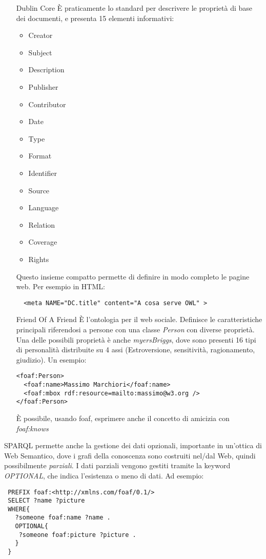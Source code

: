\begin{itemize}
\item[Dublin Core] \`E praticamente lo standard per descrivere le propriet\`a di base dei documenti, e presenta 15 elementi informativi:
  \begin{itemize}
  \item Creator
  \item Subject
  \item Description
  \item Publisher
  \item Contributor
  \item Date
  \item Type
  \item Format
  \item Identifier
  \item Source
  \item Language
  \item Relation
  \item Coverage
  \item Rights
  \end{itemize}
  Questo insieme compatto permette di definire in modo completo le pagine web. Per esempio in HTML:
\begin{verbatim}
  <meta NAME="DC.title" content="A cosa serve OWL" >
\end{verbatim}

\item[Friend Of A Friend]\`E l'ontologia per il web sociale. Definisce le caratteristiche principali riferendosi a persone con una classe \textit{Person} con diverse propriet\`a. Una delle possibili propriet\`a \`e anche \textit{myersBriggs}, dove sono presenti 16 tipi di personalit\`a distribuite su 4 assi (Estroversione, sensitivit\`a, ragionamento, giudizio). Un esempio:
\begin{verbatim}
<foaf:Person>
  <foaf:name>Massimo Marchiori</foaf:name>
  <foaf:mbox rdf:resource=mailto:massimo@w3.org />
</foaf:Person>
\end{verbatim}

\`E possibile, usando foaf, esprimere anche il concetto di amicizia con \textit{foaf:knows}
\end{itemize}


SPARQL permette anche la gestione dei dati opzionali, importante in un'ottica di Web Semantico, dove i grafi della conoscenza sono costruiti nel/dal Web, quindi possibilmente \textit{parziali}. I dati parziali vengono gestiti tramite la keyword \textit{OPTIONAL}, che indica l'esistenza o meno di dati. Ad esempio:
\begin{verbatim}
 PREFIX foaf:<http://xmlns.com/foaf/0.1/>
 SELECT ?name ?picture
 WHERE{
   ?someone foaf:name ?name .
   OPTIONAL{
    ?someone foaf:picture ?picture .
   }
 }
\end{verbatim}


